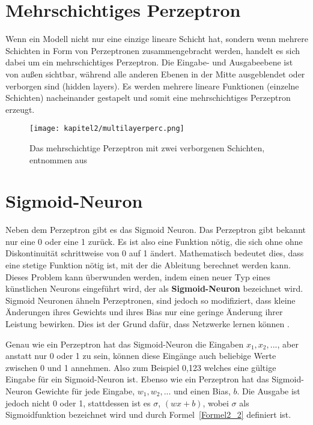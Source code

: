 \section{Mehrschichtiges Perzeptron}

Wenn ein Modell nicht nur eine einzige lineare Schicht hat, sondern wenn mehrere Schichten in Form von Perzeptronen zusammengebracht werden, handelt es sich dabei um ein mehrschichtiges Perzeptron. Die Eingabe- und Ausgabeebene  ist von außen sichtbar, während alle anderen Ebenen in der Mitte ausgeblendet oder verborgen sind (hidden layers). Es werden mehrere lineare Funktionen (einzelne Schichten) nacheinander gestapelt und somit eine  mehrschichtiges Perzeptron erzeugt.

\begin{figure}[H]
    \centering
    \texttt{[image: kapitel2/multilayerperc.png]}
    \caption[Das mehrschichtige Perzeptron]{Das mehrschichtige Perzeptron mit zwei verborgenen Schichten, entnommen aus \cite*{Gardner1998}}
    \label{Kap2:Multi}
\end{figure}


\section{Sigmoid-Neuron}

Neben dem Perzeptron gibt es das Sigmoid Neuron. Das Perzeptron gibt bekannt nur eine 0 oder eine 1 zurück. Es ist also eine Funktion nötig, die sich ohne ohne Diskontinuität schrittweise von 0 auf 1 ändert. Mathematisch bedeutet dies, dass eine stetige Funktion nötig ist, mit der die Ableitung berechnet werden kann. Dieses Problem kann überwunden werden, indem einen neuer Typ eines künstlichen Neurons eingeführt wird, der als \textbf{Sigmoid-Neuron} bezeichnet wird. Sigmoid Neuronen ähneln Perzeptronen, sind jedoch so modifiziert, dass kleine Änderungen ihres Gewichts und ihres Bias nur eine geringe Änderung ihrer Leistung bewirken. Dies ist der Grund dafür, dass Netzwerke lernen können \cite*[8]{Nielsen2015}.


Genau wie ein Perzeptron hat das Sigmoid-Neuron die Eingaben $x_1, x_2, ...$, aber anstatt nur 0 oder 1 zu sein, können diese Eingänge auch beliebige Werte zwischen 0 und 1 annehmen. Also zum Beispiel 0,123 welches eine gültige Eingabe für ein Sigmoid-Neuron ist. Ebenso wie ein Perzeptron hat das Sigmoid-Neuron Gewichte für jede Eingabe, $w_1, w_2, ...$ und einen Bias, $b$. Die Ausgabe ist jedoch nicht 0 oder 1, stattdessen ist es $\sigma$, $(wx + b)$, wobei $\sigma$ als Sigmoidfunktion bezeichnet wird und durch Formel~\ref{Formel2_2} definiert ist.

